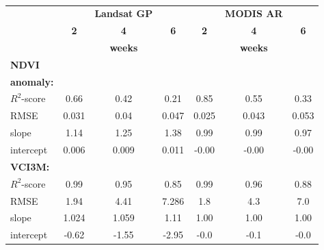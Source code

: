 \documentclass[review]{elsarticle}
\begin{document}
\begin{figure}
	\caption{} \label{fig:gpcontour}
\end{figure}

\begin{table}
	\small
	\caption{ } \label{tab:stats}
	\centering
	\begin{tabular}{l|ccc|ccc} 
		\toprule
		& & \textbf{Landsat GP} & & &\textbf{MODIS AR} \\
		& \textbf{2} & \textbf{4} & \textbf{6} & \textbf{2} & \textbf{4} & \textbf{6} \\
		& \multicolumn{3}{c|}{\textbf{weeks }}& \multicolumn{3}{c}{\textbf{weeks }}\\

		\midrule
		\textbf{NDVI }&&&&&\\
		\textbf{anomaly:}&&&&&\\
		$R^2$-score  &0.66  &0.42  &0.21  &0.85& 0.55& 0.33\\
		RMSE &0.031  &0.04  &0.047  &0.025& 0.043& 0.053\\
		slope &1.14  &1.25 &1.38 &0.99&0.99& 0.97\\
		intercept &0.006 &0.009 &0.011&-0.00& -0.00& -0.00\\
		\midrule
		\textbf{VCI3M:}&&&&&\\
		$R^2$-score  &0.99  &0.95  &0.85  &0.99& 0.96& 0.88\\
		RMSE &1.94  &4.41  &7.286  &1.8& 4.3& 7.0 \\
		slope &1.024  &1.059 &1.11 &1.00&1.00& 1.00\\
		intercept &-0.62  &-1.55 &-2.95&-0.0& -0.1& -0.0\\
		\bottomrule
	\end{tabular}
\end{table}
\end{document}
